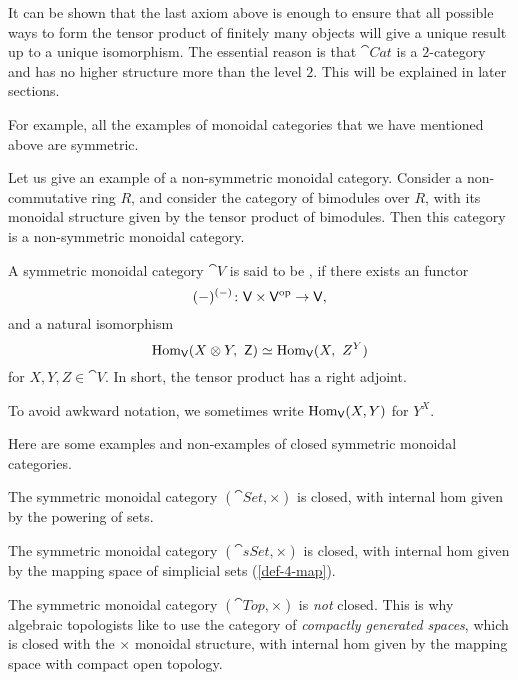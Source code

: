 It can be shown that the last axiom above is enough
to ensure that all possible ways to form the tensor product 
of finitely many objects will give a unique result up to 
a unique isomorphism.
The essential reason is that $\cat{Cat}$ is a $2$-category 
and has no higher structure more than the level $2$.
This will be explained in later sections.

For example, all the examples of monoidal categories
that we have mentioned above are symmetric.

\begin{example}
    Let us give an example of a non-symmetric monoidal category.
    Consider a non-commutative ring $R$,
    and consider the category of bimodules over $R$,
    with its monoidal structure given by the tensor product of bimodules.
    Then this category is a non-symmetric monoidal category.
    \varqed
\end{example}

\begin{definition}
    A symmetric monoidal category $\cat{V}$ is said to be ,
    if there exists an  functor 
    \[ (-)^{(-)} \colon \mathsf{V} \times \mathsf{V}^{\mathrm{op}} \to \mathsf{V}, \]
    and a natural isomorphism 
    \[ \operatorname{Hom}_{\mathsf{V}}(X \otimes Y,\ \mathsf{Z}) \simeq 
    \operatorname{Hom}_{\mathsf{V}}(X,\ Z^Y) \]
    for $X,Y,Z\in\cat{V}$.
    In short, the tensor product has a right adjoint.
\end{definition}

To avoid awkward notation,
we sometimes write $\operatorname{Hom}_{\mathsf{V}}(X,Y)$ for $Y^X$.

\begin{example}
    Here are some examples and non-examples of closed symmetric monoidal categories.
    \begin{itms}
        \item The symmetric monoidal category $(\cat{Set},\times)$ is closed,
        with internal hom given by the powering of sets.

        \item The symmetric monoidal category $(\cat{sSet},\times)$ is closed,
        with internal hom given by the mapping space of simplicial sets (\ref{def-4-map}).

        \item The symmetric monoidal category $(\cat{Top},\times)$ is \emph{not} closed.
        This is why algebraic topologists like to use the category of
        \emph{compactly generated spaces}, which is closed with the $\times$ monoidal structure,
        with internal hom given by the mapping space with compact open topology. \varqed
    \end{itms}
\end{example}

